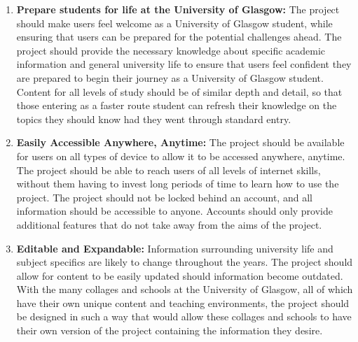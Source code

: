 \documentclass{l4proj}
\begin{document}
\begin{enumerate}
    \item \textbf{Prepare students for life at the University of Glasgow:} The project should make users feel welcome as a University of Glasgow student,  while ensuring that users can be prepared for the potential challenges ahead. The project should provide the necessary knowledge about specific academic information and general university life to ensure that users feel confident they are prepared to begin their journey as a University of Glasgow student. Content for all levels of study should be of similar depth and detail,  so that those entering as a faster route student can refresh their knowledge on the topics they should know had they went through standard entry.


    \item\textbf{Easily Accessible Anywhere,  Anytime:} The project should be available for users on all types of device to allow it to be accessed anywhere,  anytime. The project should be able to reach users of all levels of internet skills,  without them having to invest long periods of time to learn how to use the project. The project should not be locked behind an account,  and all information should be accessible to anyone. Accounts should only provide additional features that do not take away from the aims of the project.


    \item\textbf{Editable and Expandable:} Information surrounding university life and subject specifics are likely to change throughout the years. The project should allow for content to be easily updated should information become outdated. With the many collages and schools at the University of Glasgow,  all of which have their own unique content and teaching environments,  the project should be designed in such a way that would allow these collages and schools to have their own version of the project containing the information they desire.
\end{enumerate}
\end{document}
